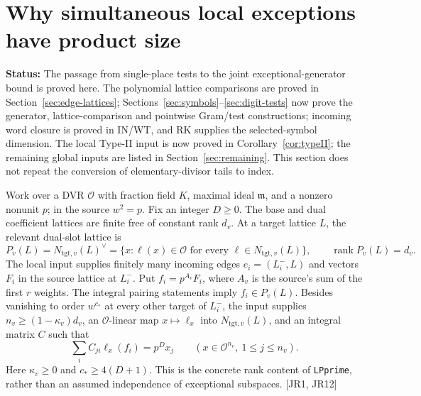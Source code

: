 \documentclass[11pt,a4paper]{article}
\numberwithin{equation}{section}
\theoremstyle{remark}\newtheorem{remark}[theorem]{Remark}
\newcommand{\status}[1]{\textbf{Status:} #1}
\begin{document}
\section{Why simultaneous local exceptions have product size}\label{sec:joint-rank}

\status{The passage from single-place tests to the joint exceptional-generator bound is proved here. The polynomial lattice comparisons are proved in Section~\ref{sec:edge-lattices}; Sections~\ref{sec:symbols}--\ref{sec:digit-tests} now prove the generator, lattice-comparison and pointwise Gram/test constructions; incoming word closure is proved in IN/WT, and RK supplies the selected-symbol dimension. The local Type-II input is now proved in Corollary~\ref{cor:typeII}; the remaining global inputs are listed in Section~\ref{sec:remaining}. This section does not repeat the conversion of elementary-divisor tails to index.}

Work over a DVR $\mathcal O$ with fraction field $K$, maximal ideal $\mathfrak m$, and a nonzero nonunit $p$; in the source $w^2=p$. Fix an integer $D\ge0$. The base and dual coefficient lattices are finite free of constant rank $d_v$. At a target lattice $L$, the relevant dual-slot lattice is
\[
 P_v(L)=N_{\mathrm{tgt},v}(L)^\vee
   =\{x:\ell(x)\in\mathcal O\text{ for every }\ell\in N_{\mathrm{tgt},v}(L)\},
 \qquad \operatorname{rank}P_v(L)=d_v.
\]
The local input supplies finitely many incoming edges $e_i=(L_i^-,L)$ and vectors $F_i$ in the source lattice at $L_i^-$. Put $f_i=p^{A_v}F_i$, where $A_v$ is the source's sum of the first $r$ weights. The integral pairing statements imply $f_i\in P_v(L)$. Besides vanishing to order $w^{c_*}$ at every other target of $L_i^-$, the input supplies $n_v\ge(1-\kappa_v)d_v$, an $\mathcal O$-linear map $x\mapsto\ell_x$ into $N_{\mathrm{tgt},v}(L)$, and an integral matrix $C$ such that
\begin{equation}\label{eq:jr-tests}
 \sum_i C_{ji}\ell_x(f_i)=p^D x_j
 \qquad(x\in\mathcal O^{n_v},\ 1\le j\le n_v).
\end{equation}
Here $\kappa_v\ge0$ and $c_*\ge4(D+1)$. This is the concrete rank content of \texttt{LPprime}, rather than an assumed independence of exceptional subspaces. \textsf{[JR1, JR12]}
\end{document}
